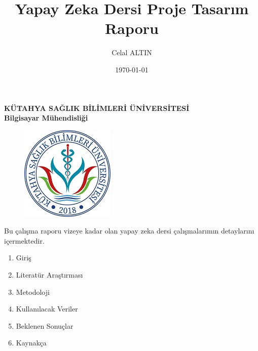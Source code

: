 \documentclass[12pt, a4paper]{article}
\title{ Yapay Zeka Dersi Proje Tasarım Raporu}
\author{Celal ALTIN}
\date{\today}
\begin{document}
	\textbf{KÜTAHYA SAĞLIK BİLİMLERİ ÜNİVERSİTESİ}\centering\\
	\textbf{Bilgisayar Mühendisliği}\centering
	\begin{figure}[!h]
		\centering
		\includegraphics{ksbu.png}
	\end{figure}
	\thispagestyle{empty}
	
	\maketitle\raggedright
	\maketitle\raggedright
	\maketitle
Bu çalışma raporu vizeye kadar olan yapay zeka dersi çalışmalarımın detaylarını içermektedir.

\begin{enumerate} 
	\item Giriş
	\item Literatür Araştırması
	\item Metodoloji
	\item Kullanılacak Veriler
	\item Beklenen Sonuçlar %
	\item Kaynakça
\end{enumerate}\raggedright
\newpage
\end{document}
